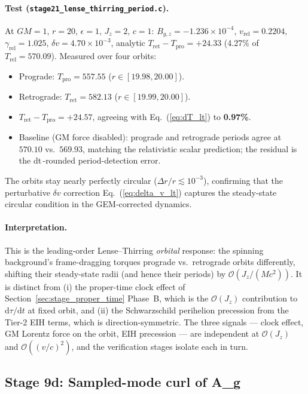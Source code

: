 \documentclass[11pt,a4paper]{article}
\newcommand{\order}[1]{\mathcal{O}(#1)}
\newcommand{\dd}{\mathrm{d}}
\begin{document}
\paragraph{Test (\texttt{stage21\_lense\_thirring\_period.c}).}
At $GM=1$, $r=20$, $\epsilon=1$, $J_z=2$, $c=1$:
$B_{g,z} = -1.236\times 10^{-4}$, $v_{\mathrm{rel}} = 0.2204$,
$\gamma_{\mathrm{rel}} = 1.025$, $\delta v = 4.70\times 10^{-3}$,
analytic $T_{\mathrm{ret}} - T_{\mathrm{pro}} = +24.33$
(4.27\% of $T_{\mathrm{rel}} = 570.09$).  Measured over four orbits:
\begin{itemize}
  \item Prograde:   $T_{\mathrm{pro}} = 557.55$  ($r \in [19.98, 20.00]$).
  \item Retrograde: $T_{\mathrm{ret}} = 582.13$  ($r \in [19.99, 20.00]$).
  \item $T_{\mathrm{ret}} - T_{\mathrm{pro}} = +24.57$, agreeing with
    Eq.~(\ref{eq:dT_lt}) to \textbf{0.97\%}.
  \item Baseline (GM force disabled): prograde and retrograde periods
    agree at $570.10$ vs.\ $569.93$, matching the relativistic
    scalar prediction; the residual is the dt$\,$-rounded period-detection
    error.
\end{itemize}
The orbits stay nearly perfectly circular ($\Delta r/r \lesssim 10^{-3}$),
confirming that the perturbative $\delta v$ correction
Eq.~(\ref{eq:delta_v_lt}) captures the steady-state circular condition
in the GEM-corrected dynamics.

\paragraph{Interpretation.}  This is the leading-order Lense--Thirring
\emph{orbital} response: the spinning background's frame-dragging
torques prograde vs.\ retrograde orbits differently, shifting their
steady-state radii (and hence their periods) by $\order{J_z/(Mc^2)}$.
It is distinct from (i) the proper-time clock effect of
Section~\ref{sec:stage_proper_time} Phase~B, which is the
$\order{J_z}$ contribution to $\dd\tau/\dd t$ at fixed orbit, and
(ii) the Schwarzschild perihelion precession from the Tier-2 EIH terms,
which is direction-symmetric.  The three signals --- clock effect, GM
Lorentz force on the orbit, EIH precession --- are independent at
$\order{J_z}$ and $\order{(v/c)^2}$, and the verification stages
isolate each in turn.

\subsection{Stage 9d: Sampled-mode curl of A\_g}
\label{sec:stage_sampled_curl}
\end{document}
